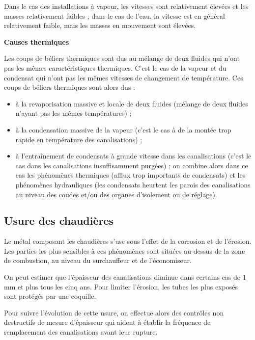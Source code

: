 Dans le cas des installations à vapeur, les vitesses sont relativement élevées et les masses relativement faibles ; dans le cas de l’eau, la vitesse est en général relativement faible, mais les masses en mouvement sont élevées.


\vspace{0.3cm}
\textbf{Causes thermiques}
\vspace{0.3cm}

Les coups de béliers thermiques sont dus au mélange de deux fluides qui n’ont pas les mêmes caractéristiques thermiques. C’est le cas de la vapeur et du condensat qui n’ont pas les mêmes vitesses de changement de température. Ces coups de béliers thermiques sont alors dus :

\begin{itemize}
\item à la revaporisation massive et locale de deux fluides (mélange de deux fluides n’ayant pas les mêmes températures) ;
\item à la condensation massive de la vapeur (c’est le cas à de la montée trop rapide en température des canalisations) ;
\item à l’entraînement de condensats à grande vitesse dans les canalisations (c’est le cas dans les canalisations insuffisamment purgées) ; on combine alors dans ce cas les phénomènes thermiques (afflux trop importants de condensats) et les phénomènes hydrauliques (les condensats heurtent les parois des canalisations au niveau des coudes et/ou des organes d’isolement ou de réglage).
\end{itemize}

\subsection{Usure des chaudières}

Le métal composant les chaudières s’use sous l’effet de la corrosion et de l’érosion. Les parties les plus sensibles à ces phénomènes sont situées au-dessus de la zone de combustion, au niveau du surchauffeur et de l’économiseur.
\vspace{0.3cm}

On peut estimer que l’épaisseur des canalisations diminue dans certains cas de 1 mm et plus tous les cinq ans. Pour limiter l’érosion, les tubes les plus exposés sont protégés par une coquille.
\vspace{0.3cm}

Pour suivre l’évolution de cette usure, on effectue alors des contrôles non destructifs de mesure d’épaisseur qui aident à établir la fréquence de remplacement des canalisations avant leur rupture.




